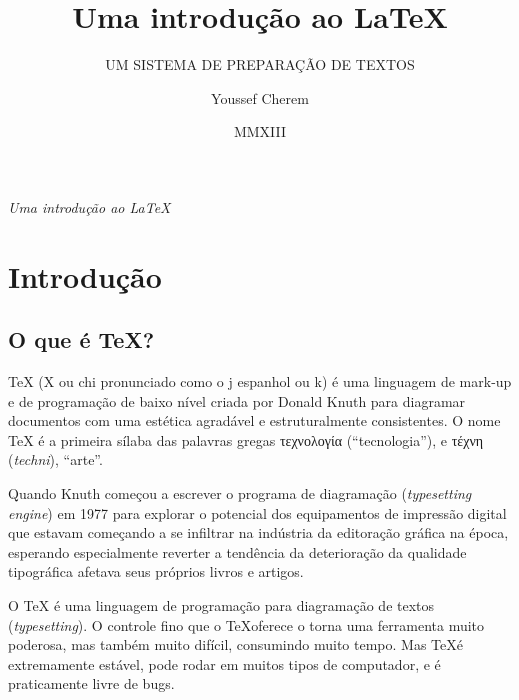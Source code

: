 \documentclass[a4paper,numbers=noenddot,abstract,DIV=calc]{scrbook} %
\title{%
\textcolor{YellowOrange}{Uma introdução ao LaTeX}}
\subtitle{\textcolor{Dandelion}{\addfontfeatures{Style=TitlingCaps} \rmfamily UM SISTEMA DE PREPARAÇÃO DE TEXTOS}}
\author{Youssef Cherem}
\date{MMXIII}
\begin{document}
\frenchspacing

\frontmatter


\begin{titlepage}
\phantom{X}
\vfill
\raggedleft \Huge \emph{Uma introdução ao \LaTeX}
\vfill
\end{titlepage}

\maketitle

\restoregeometry



\tableofcontents

\listoffigures

\listoftables

\mainmatter
\chapter{Introdução}

\section{O que é TeX?}
\TeX{} (X ou chi pronunciado como o j espanhol ou k) é uma linguagem de mark-up e de programação de baixo nível criada por Donald Knuth para diagramar documentos com uma estética agradável e estruturalmente consistentes. O nome \TeX{} é a primeira sílaba das palavras gregas \textgreek{τεχνολογία} (``tecnologia''), e \textgreek{τέχνη} (\textit{techni}), ``arte''.
	
Quando Knuth começou a escrever o programa de diagramação (\textit{typesetting engine}) em 1977 para explorar o potencial dos equipamentos de impressão digital que estavam começando a se infiltrar na indústria da editoração gráfica na época, esperando especialmente reverter a tendência da deterioração da qualidade tipográfica afetava seus próprios livros e artigos.

O TeX é uma linguagem de programação para diagramação de textos (\textit{typesetting}). O controle fino que o \TeX oferece o torna uma ferramenta muito poderosa, mas também muito difícil, consumindo muito tempo.  Mas \TeX é extremamente estável, pode rodar em muitos tipos de computador, e é praticamente livre de bugs.
\end{document}
